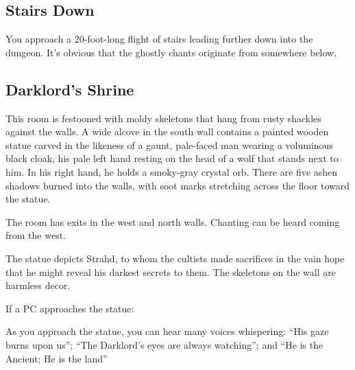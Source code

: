 \begin{arealinks}
\end{arealinks}


\pagebreak
\subsection{Stairs Down}
\label{sec:StairsDown}
\begin{readout}
  You approach a 20-foot-long flight of stairs leading further down into the dungeon. It's obvious that the
  ghostly chants originate from somewhere below.
\end{readout}

\begin{arealinks}
\end{arealinks}


\pagebreak
\subsection{Darklord's Shrine}
\label{sec:DarklordsShrine}
\begin{readout}
  This room is festooned with moldy skeletons that hang from rusty shackles against the walls. A wide alcove
  in the south wall contains a painted wooden statue carved in the likeness of a gaunt, pale-faced man wearing
  a voluminous black cloak, his pale left hand resting on the head of a wolf that stands next to him. In his
  right hand, he holds a smoky-gray crystal orb. There are five ashen shadows burned into the walls, with soot
  marks stretching across the floor toward the statue.
  
  The room has exits in the west and north walls. Chanting can be heard coming from the west.
\end{readout}
The statue depicts Strahd, to whom the cultists made sacrifices in the vain hope that he might reveal his
darkest secrets to them. The skeletons on the wall are harmless decor.

If a PC approaches the statue:
\begin{readout}
  As you approach the statue, you can hear many voices whispering: ``His gaze burns upon us''; ``The Darklord's
  eyes are always watching''; and ``He is the Ancient; He is the land''
\end{readout}

